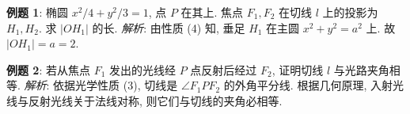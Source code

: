 \begin{examplebox}
\textbf{例题 1}: 椭圆 $x^2/4 + y^2/3 = 1$, 点 $P$ 在其上. 焦点 $F_1, F_2$ 在切线 $l$ 上的投影为 $H_1, H_2$. 求 $|OH_1|$ 的长.
\textit{解析}: 由性质 (4) 知, 垂足 $H_1$ 在主圆 $x^2+y^2=a^2$ 上. 故 $|OH_1| = a = 2$.

\textbf{例题 2}: 若从焦点 $F_1$ 发出的光线经 $P$ 点反射后经过 $F_2$, 证明切线 $l$ 与光路夹角相等.
\textit{解析}: 依据光学性质 (3), 切线是 $\angle F_1PF_2$ 的外角平分线. 根据几何原理, 入射光线与反射光线关于法线对称, 则它们与切线的夹角必相等.
\end{examplebox}